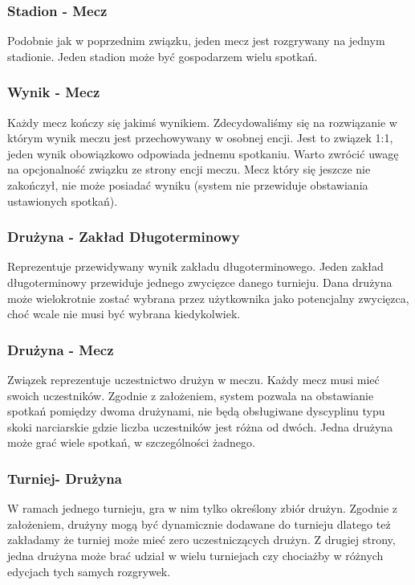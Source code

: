 \documentclass{mwrep}
\begin{document}
\subsubsection{Stadion - Mecz}
Podobnie jak w poprzednim związku, jeden mecz jest rozgrywany na jednym stadionie. Jeden stadion może być gospodarzem
wielu spotkań.

\subsubsection{Wynik - Mecz}
Każdy mecz kończy się jakimś wynikiem. Zdecydowaliśmy się na rozwiązanie w którym wynik meczu jest przechowywany w osobnej encji.
Jest to związek 1:1, jeden wynik obowiązkowo odpowiada jednemu spotkaniu. Warto zwrócić uwagę na opcjonalność związku ze strony encji meczu.
Mecz który się jeszcze nie zakończył, nie może posiadać wyniku (system nie przewiduje obstawiania ustawionych spotkań).

\subsubsection{Drużyna - Zakład Długoterminowy}
Reprezentuje przewidywany wynik zakładu długoterminowego. Jeden zakład długoterminowy przewiduje jednego zwycięzce danego turnieju. 
Dana drużyna może wielokrotnie zostać wybrana przez użytkownika jako potencjalny zwycięzca, choć wcale nie musi być wybrana kiedykolwiek.

\subsubsection{Drużyna - Mecz}
Związek reprezentuje uczestnictwo drużyn w meczu. Każdy mecz musi mieć swoich uczestników. Zgodnie z założeniem, system pozwala na 
obstawianie spotkań pomiędzy dwoma drużynami, nie będą obsługiwane dyscyplinu typu skoki narciarskie gdzie liczba uczestników jest różna od dwóch.
Jedna drużyna może grać wiele spotkań, w szczególności żadnego.


\subsubsection{Turniej- Drużyna }
W ramach jednego turnieju, gra w nim tylko określony zbiór drużyn. Zgodnie z założeniem, drużyny mogą być dynamicznie dodawane 
do turnieju dlatego też zakładamy że turniej może mieć zero uczestniczących drużyn. Z drugiej strony, jedna drużyna może brać udział 
w wielu turniejach czy chociażby w różnych edycjach tych samych rozgrywek.
\end{document}
